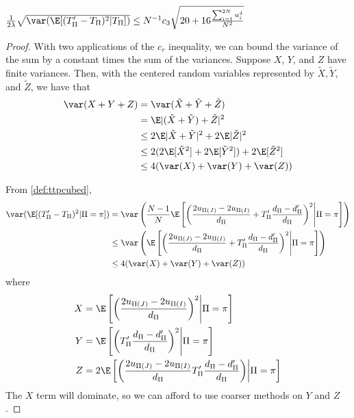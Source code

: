 \begin{proposition}
  \label{P:P2}
  $\frac{1}{2\lambda} \sqrt{\var (\E [(T_{\Pi}'-T_{\Pi})^2|T_{\Pi}])} \leq 
  N^{-1} c_3\sqrt{20 + 16\frac{\sum_{i=1}^{2N} u_{i}^4}{N^2}}$
\end{proposition}
\begin{proof}
  With two applications of the $c_r$ inequality, we can bound the variance of the sum by a constant
times the sum of the variances.  Suppose $X$, $Y$, and $Z$ have finite variances.  Then, with the
centered random variables represented by $\tilde{X}, \tilde{Y}$, and $\tilde{Z}$, we have that
  \begin{align*}
    \var(X + Y + Z) 
    &= \var(\tilde{X}+\tilde{Y}+\tilde{Z}) \\
    &= \E|(\tilde{X}+\tilde{Y})+\tilde{Z}|^2 \\
    &\leq 2 \E |\tilde{X}+\tilde{Y}|^2 + 2\E |\tilde{Z}|^2 \\
    &\leq 2(2\E[\tilde{X}^2] + 2\E[\tilde{Y}^2]) + 2\E[\tilde{Z}^2] \\
    &\leq 4(\var(X) + \var(Y) + \var(Z))
  \end{align*}

  From \eqref{def:ttpcubed},
  \begin{align*}
    \var (\E[(T_{\Pi}'-T_{\Pi})^2 | \Pi = \pi]) &= \var \left ( \frac{N-1}{N}\E \left [
      \left ( \frac{2u_{\Pi(J)}-2u_{\Pi(I)}}{d_{\Pi}}+T_{\Pi}'\frac{d_{\Pi}-d_{\Pi}'}{d_{\Pi}} \right )^2
        \middle | \Pi = \pi \right ] \right ) \\
    &\leq \var \left ( \E \left [
      \left ( \frac{2u_{\Pi(J)}-2u_{\Pi(I)}}{d_{\Pi}}+T_{\Pi}'\frac{d_{\Pi}-d_{\Pi}'}{d_{\Pi}} \right )^2
        \middle | \Pi = \pi \right ] \right ) \\
    &\leq 4(\var(X) + \var(Y) + \var(Z))
  \end{align*}
  where
  \begin{align*}
    X &= \E \left [ \left ( \frac{2u_{\Pi(J)}-2u_{\Pi(I)}}{d_{\Pi}} \right )^2
        \middle | \Pi = \pi \right ] \\
    Y &= \E \left [ \left
          ( T_{\Pi}'\frac{d_{\Pi}-d_{\Pi}'}{d_{\Pi}} \right )^2 \middle | \Pi = \pi \right ] \\
    Z &= 2 \E \left [ \left ( \frac{2u_{\Pi(J)}-2u_{\Pi(I)}}{d_{\Pi}}
         T_{\Pi}'\frac{d_{\Pi}-d_{\Pi}'}{d_{\Pi}} \right ) \middle | \Pi = \pi \right ]
  \end{align*}
  The $X$ term will dominate, so we can afford to use coarser methods on $Y$ and $Z$.


\end{proof}
